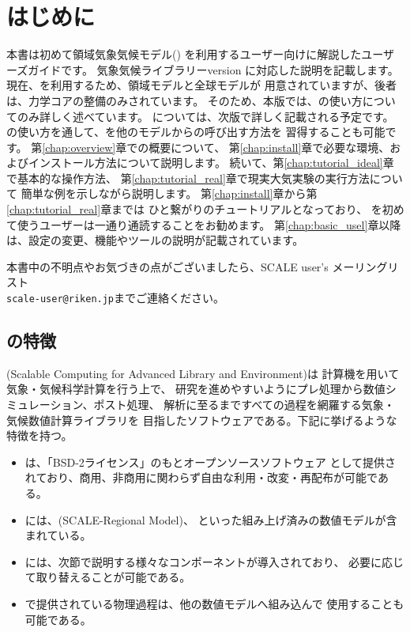 \section{はじめに} \label{sec:introduction}

本書は初めて領域気象気候モデル({\scalerm})
を利用するユーザー向けに解説したユーザーズガイドです。
気象気候ライブラリー\scalelib version \version に対応した説明を記載します。
現在、\scalelib を利用するため、領域モデル\scalerm と全球モデル\scalegm が
用意されていますが、後者は、力学コアの整備のみされています。
そのため、本版では、\scalerm の使い方についてのみ詳しく述べています。
\scalegm については、次版で詳しく記載される予定です。
\scalerm の使い方を通して、\scalelib を他のモデルからの呼び出す方法を
習得することも可能です。
第\ref{chap:overview}章で\scalelib の概要について、
第\ref{chap:install}章で必要な環境、およびインストール方法について説明します。
続いて、第\ref{chap:tutorial_ideal}章で基本的な操作方法、
第\ref{chap:tutorial_real}章で現実大気実験の実行方法について
簡単な例を示しながら説明します。
第\ref{chap:install}章から第\ref{chap:tutorial_real}章までは
ひと繋がりのチュートリアルとなっており、
\scalerm を初めて使うユーザーは一通り通読することをお勧めます。
第\ref{chap:basic_usel}章以降は、設定の変更、機能やツールの説明が記載されています。

本書中の不明点やお気づきの点がございましたら、SCALE user's メーリングリスト\\
 \verb|scale-user@riken.jp|までご連絡ください。



\subsection{\scalelib の特徴} \label{subsec:scale_feature}

\scalelib (Scalable Computing for Advanced Library and Environment)は
計算機を用いて気象・気候科学計算を行う上で、
研究を進めやすいようにプレ処理から数値シミュレーション、ポスト処理、
解析に至るまですべての過程を網羅する気象・気候数値計算ライブラリを
目指したソフトウェアである。下記に挙げるような特徴を持つ。
\begin{itemize}
\item \scalelib は、「BSD-2ライセンス」のもとオープンソースソフトウェア
として提供されており、商用、非商用に関わらず自由な利用・改変・再配布が可能である。
\item \scalelib には、\scalerm (SCALE-Regional Model)、
といった組み上げ済みの数値モデルが含まれている。
\item \scalelib には、次節で説明する様々なコンポーネントが導入されており、
必要に応じて取り替えることが可能である。
\item \scalelib で提供されている物理過程は、他の数値モデルへ組み込んで
使用することも可能である。
\end{itemize}


